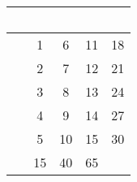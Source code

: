 \documentclass{article}
\begin{document}
\begin{tabular}{| c | c | c | c | c |}
\hline
~ & ~ & ~ & ~ & ~ \\ \hline
~ & 1 & 6 & 11 & 18 \\ \hline
~ & 2 & 7 & 12 & 21 \\ \hline
~ & 3 & 8 & 13 & 24 \\ \hline
~ & 4 & 9 & 14 & 27 \\ \hline
~ & 5 & 10 & 15 & 30 \\ \hline
~ & 15 & 40 & 65 & ~ \\ \hline
\end{tabular}
\end{document}
